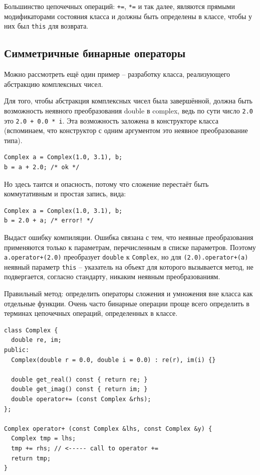 \documentclass[a4paper,12pt,oneside]{book}
\begin{document}
Большинство цепочечных операций: \lstinline!+=!, \lstinline!*=! и так далее, являются прямыми модификаторами состояния класса и должны быть определены в классе, чтобы у них был \lstinline!this! для возврата.

\subsection{Симметричные бинарные операторы}\label{SymmBinary}

Можно рассмотреть ещё один пример -- разработку класса, реализующего абстракцию комплексных чисел.

Для того, чтобы абстракция комплексных чисел была завершённой, должна быть возможность неявного преобразования double в complex, ведь по сути число \lstinline!2.0! это \lstinline!2.0 + 0.0 * i!. Эта возможность заложена в конструкторе класса (вспоминаем, что конструктор с одним аргументом это неявное преобразование типа).

\begin{lstlisting}
Complex a = Complex(1.0, 3.1), b;
b = a + 2.0; /* ok */
\end{lstlisting}

Но здесь таится и опасность, потому что сложение перестаёт быть коммутативным и простая запись, вида:

\begin{lstlisting}
Complex a = Complex(1.0, 3.1), b;
b = 2.0 + a; /* error! */
\end{lstlisting}

Выдаст ошибку компиляции. Ошибка связана с тем, что неявные преобразования применяются только к параметрам, перечисленным в списке параметров. Поэтому \lstinline!a.operator+(2.0)! преобразует \lstinline!double! к \lstinline!Complex!, но для \lstinline!(2.0).operator+(a)! неявный параметр \lstinline!this! -- указатель на объект для которого вызывается метод, не подвергается, согласно стандарту, никаким неявным преобразованиям.

Правильный метод: определить операторы сложения и умножения вне класса как отдельные функции. Очень часто бинарные операции проще всего определить в терминах цепочечных операций, определенных в классе.

\begin{lstlisting}
class Complex {
  double re, im;  
public:
  Complex(double r = 0.0, double i = 0.0) : re(r), im(i) {}

  double get_real() const { return re; }
  double get_imag() const { return im; }
  double operator+= (const Complex &rhs);
};

Complex operator+ (const Complex &lhs, const Complex &y) { 
  Complex tmp = lhs;
  tmp += rhs; // <----- call to operator +=
  return tmp;
}
\end{lstlisting}
\end{document}

